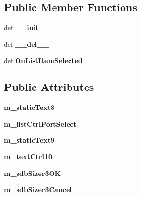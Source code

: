 \subsection*{Public Member Functions}
\begin{DoxyCompactItemize}
\item 
\hypertarget{classtop_frame_1_1_dlg_com_ports_ae98733e64a744a52bfbc8c0f49af99e5}{def {\bfseries \-\_\-\-\_\-init\-\_\-\-\_\-}}\label{classtop_frame_1_1_dlg_com_ports_ae98733e64a744a52bfbc8c0f49af99e5}

\item 
\hypertarget{classtop_frame_1_1_dlg_com_ports_aa849a2e894a2f9b82177d7df02a552f8}{def {\bfseries \-\_\-\-\_\-del\-\_\-\-\_\-}}\label{classtop_frame_1_1_dlg_com_ports_aa849a2e894a2f9b82177d7df02a552f8}

\item 
\hypertarget{classtop_frame_1_1_dlg_com_ports_a01e8607331a41ba1c2a13a07403967a2}{def {\bfseries On\-List\-Item\-Selected}}\label{classtop_frame_1_1_dlg_com_ports_a01e8607331a41ba1c2a13a07403967a2}

\end{DoxyCompactItemize}
\subsection*{Public Attributes}
\begin{DoxyCompactItemize}
\item 
\hypertarget{classtop_frame_1_1_dlg_com_ports_a156b1a6dcc89ba6de5f1c22f9467e783}{{\bfseries m\-\_\-static\-Text8}}\label{classtop_frame_1_1_dlg_com_ports_a156b1a6dcc89ba6de5f1c22f9467e783}

\item 
\hypertarget{classtop_frame_1_1_dlg_com_ports_a81255da6dfb053727fe00b99cad70da1}{{\bfseries m\-\_\-list\-Ctrl\-Port\-Select}}\label{classtop_frame_1_1_dlg_com_ports_a81255da6dfb053727fe00b99cad70da1}

\item 
\hypertarget{classtop_frame_1_1_dlg_com_ports_ab3d37ce653a67b581fd9a617593bafb6}{{\bfseries m\-\_\-static\-Text9}}\label{classtop_frame_1_1_dlg_com_ports_ab3d37ce653a67b581fd9a617593bafb6}

\item 
\hypertarget{classtop_frame_1_1_dlg_com_ports_ae9daef694b60b48a96291a5621d209b4}{{\bfseries m\-\_\-text\-Ctrl10}}\label{classtop_frame_1_1_dlg_com_ports_ae9daef694b60b48a96291a5621d209b4}

\item 
\hypertarget{classtop_frame_1_1_dlg_com_ports_a4e536ff0bffe6c7e37e69de3dc800ac0}{{\bfseries m\-\_\-sdb\-Sizer3\-O\-K}}\label{classtop_frame_1_1_dlg_com_ports_a4e536ff0bffe6c7e37e69de3dc800ac0}

\item 
\hypertarget{classtop_frame_1_1_dlg_com_ports_a1881f8f6fbefea59ed1776b345949c40}{{\bfseries m\-\_\-sdb\-Sizer3\-Cancel}}\label{classtop_frame_1_1_dlg_com_ports_a1881f8f6fbefea59ed1776b345949c40}

\end{DoxyCompactItemize}


